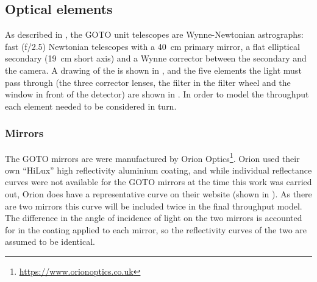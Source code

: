 
\subsection{Optical elements}
\label{sec:optics}
\begin{colsection}

As described in , the GOTO unit telescopes are Wynne-Newtonian astrographs: fast (f/2.5) Newtonian telescopes with a \SI{40}{\centi\meter} primary mirror, a flat elliptical secondary (\SI{19}{\centi\metre} short axis) and a Wynne corrector between the secondary and the camera. A drawing of the  is shown in , and the five elements the light must pass through (the three corrector lenses, the filter in the filter wheel and the window in front of the detector) are shown in . In order to model the throughput each element needed to be considered in turn.

\subsubsection{Mirrors}

The GOTO mirrors are were manufactured by Orion Optics\footnote{\url{https://www.orionoptics.co.uk}}. Orion used their own ``HiLux'' high reflectivity aluminium coating, and while individual reflectance curves were not available for the GOTO mirrors at the time this work was carried out, Orion does have a representative curve on their website (shown in ). As there are two mirrors this curve will be included twice in the final throughput model. The difference in the angle of incidence of light on the two mirrors is accounted for in the coating applied to each mirror, so the reflectivity curves of the two are assumed to be identical.

\newpage


\end{colsection}
